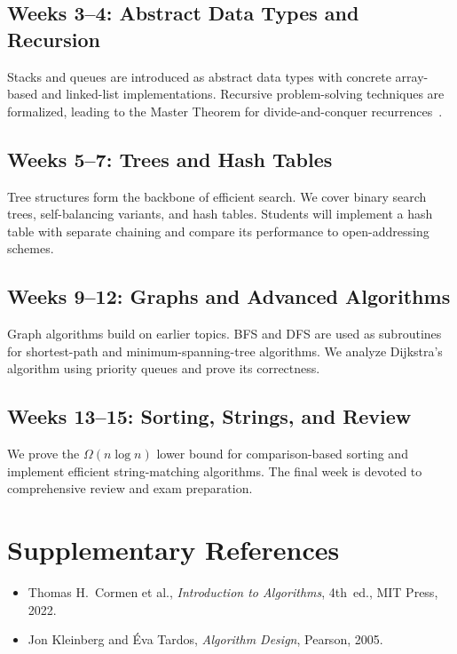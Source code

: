 \documentclass[
    language=english,
    doctype=course-material,
    institution=none,
]{../../omnilatex}
\begin{document}
\subsection{Weeks 3--4: Abstract Data Types and Recursion}

Stacks and queues are introduced as abstract data types with concrete
array-based and linked-list implementations.  Recursive problem-solving
techniques are formalized, leading to the Master Theorem for divide-and-conquer
recurrences~\cite{knuthFundamentalAlgorithms1973}.

\subsection{Weeks 5--7: Trees and Hash Tables}

Tree structures form the backbone of efficient search.  We cover binary search
trees, self-balancing variants, and hash tables.  Students will implement a
hash table with separate chaining and compare its performance to open-addressing
schemes.

\subsection{Weeks 9--12: Graphs and Advanced Algorithms}

Graph algorithms build on earlier topics.  BFS and DFS are used as subroutines
for shortest-path and minimum-spanning-tree algorithms.  We analyze Dijkstra's
algorithm using priority queues and prove its correctness.

\subsection{Weeks 13--15: Sorting, Strings, and Review}

We prove the $\Omega(n \log n)$ lower bound for comparison-based sorting and
implement efficient string-matching algorithms.  The final week is devoted to
comprehensive review and exam preparation.

\section{Supplementary References}

\begin{itemize}
    \item Thomas H.~Cormen et al., \emph{Introduction to Algorithms}, 4th~ed.,
          MIT Press, 2022.
    \item Jon Kleinberg and \'{E}va Tardos, \emph{Algorithm Design}, Pearson, 2005.
\end{itemize}

\printbibliography[heading=bibintoc,title={References}]
\end{document}
